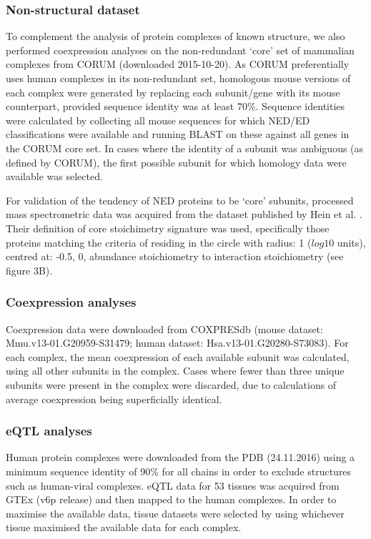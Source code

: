 \documentclass[a4paper,11pt,twoside,openright]{scrbook}
\begin{document}
\subsubsection{Non-structural dataset}
To complement the analysis of protein complexes of known structure, we also performed coexpression analyses on the non-redundant `core' set of mammalian complexes from CORUM \cite{Ruepp2009} (downloaded 2015-10-20). As CORUM preferentially uses human complexes in its non-redundant set, homologous mouse versions of each complex were generated by replacing each subunit/gene with its mouse counterpart, provided sequence identity was at least 70\%. Sequence identities were calculated by collecting all mouse sequences for which NED/ED classifications were available and running BLAST on these against all genes in the CORUM core set. In cases where the identity of a subunit was ambiguous (as defined by CORUM), the first possible subunit for which homology data were available was selected.

For validation of the tendency of NED proteins to be `core' subunits, processed mass spectrometric data was acquired from the dataset published by Hein et al. \cite{Hein2015}. Their definition of core stoichimetry signature was used, specifically those proteins matching the criteria of residing in the circle with radius: 1 ($log{10}$ units), centred at: -0.5, 0, abundance stoichiometry to interaction stoichiometry (see figure 3B\cite{Hein2015}).

\subsubsection{Coexpression analyses}
Coexpression data were downloaded from COXPRESdb \cite{Okamura2014} (mouse dataset: Mmu.v13-01.G20959-S31479; human dataset: Hsa.v13-01.G20280-S73083). For each complex, the mean coexpression of each available subunit was calculated, using all other subunits in the complex. Cases where fewer than three unique subunits were present in the complex were discarded, due to calculations of average coexpression being superficially identical.

\subsubsection{eQTL analyses}
Human protein complexes were downloaded from the PDB (24.11.2016) using a minimum sequence identity of 90\% for all chains in order to exclude structures such as human-viral complexes. eQTL data for 53 tissues was acquired from GTEx (v6p release) and then mapped to the human complexes. In order to maximise the available data, tissue datasets were selected by using whichever tissue maximised the available data for each complex.
\end{document}
